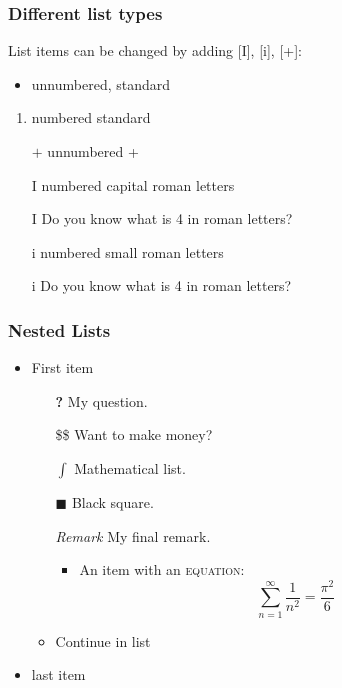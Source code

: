 \documentclass[aspectratio=169]{beamer}
\begin{document}
\begin{frame}[allowframebreaks]         %
    \frametitle{Different list types}
    List items can be changed by adding [I], [i], [+]:
    \begin{itemize}
        \item unnumbered, standard
    \end{itemize}
    \begin{enumerate}
        \item numbered standard
    \end{enumerate}
    \begin{itemize}
        \item[$+$] unnumbered +
    \end{itemize}
    \begin{enumerate}
        \item[I] numbered capital roman letters
        \item[I] Do you know what is 4 in roman letters?
    \end{enumerate}
    \begin{enumerate}
        \item[i] numbered small roman letters
        \item[i] Do you know what is 4 in roman letters?
    \end{enumerate}
\end{frame}

\begin{frame}
    \frametitle{Nested Lists}
    \begin{itemize}
        \item First item
        \begin{itemize}
            \item[\textbf{?}] My question.
            \item[\$\$] Want to make money?
            \item[$\int$] Mathematical list.
            \item[$\blacksquare$] Black square.
            \item[\textit{Remark}] My final remark.
            \begin{itemize}
                \item An item with an \textsc{equation}:
                \[ \sum_{n=1}^{\infty} \frac{1}{n^2}=\frac{\pi^2}{6}\]
            \end{itemize} 
            \item Continue in list
        \end{itemize}
        \item last item
    \end{itemize}
\end{frame}
\end{document}
